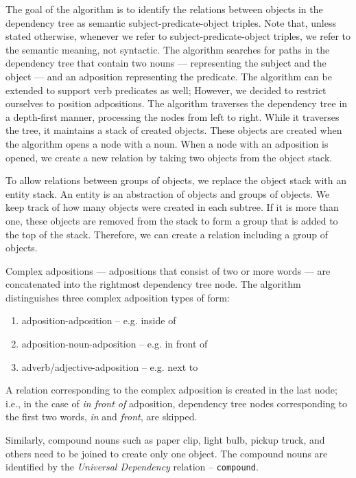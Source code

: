 \medskip

The goal of the algorithm is to identify the relations between objects in the dependency tree as semantic subject-predicate-object triples. Note that, unless stated otherwise, whenever we refer to subject-predicate-object triples, we refer to the semantic meaning, not syntactic. The algorithm searches for paths in the dependency tree that contain two nouns --- representing the subject and the object --- and an adposition representing the predicate. The algorithm can be extended to support verb predicates as well; However, we decided to restrict ourselves to position adpositions. The algorithm traverses the dependency tree in a depth-first manner, processing the nodes from left to right. While it traverses the tree, it maintains a stack of created objects. These objects are created when the algorithm opens a node with a noun. When a node with an adposition is opened, we create a new relation by taking two objects from the object stack.

\medskip

To allow relations between groups of objects, we replace the object stack with an entity stack. An entity is an abstraction of objects and groups of objects. We keep track of how many objects were created in each subtree.  If it is more than one, these objects are removed from the stack to form a group that is added to the top of the stack. Therefore, we can create a relation including a group of objects.

\medskip

Complex adpositions --- adpositions that consist of two or more words --- are concatenated into the rightmost dependency tree node. The algorithm distinguishes three complex adposition types of form: 
\begin{enumerate}
	\item adposition-adposition -- e.g. inside of
	\item adposition-noun-adposition -- e.g. in front of
    \item adverb/adjective-adposition -- e.g. next to
\end{enumerate}
A relation corresponding to the complex adposition is created in the last node; i.e., in the case of \emph{in front of} adposition, dependency tree nodes corresponding to the first two words, \emph{in} and \emph{front}, are skipped.

\medskip

Similarly, compound nouns such as paper clip, light bulb, pickup truck, and others need to be joined to create only one object. The compound nouns are identified by the \emph{Universal Dependency} \citep{nivre2020universal} relation -- \verb|compound|.

